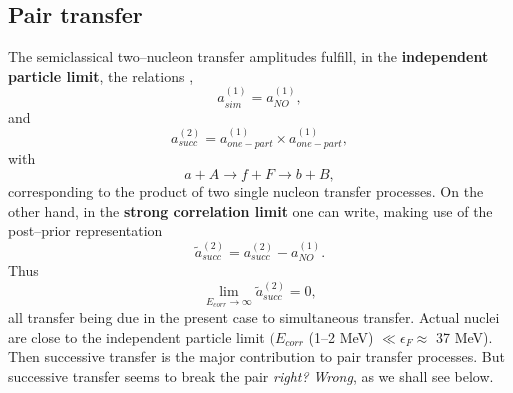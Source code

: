 \documentclass[a4paper,11pt]{book}
\numberwithin{equation}{section}
\numberwithin{figure}{section}
\numberwithin{table}{section}
\begin{document}
\begin{subappendices}
\section{Pair transfer}\label{trans_nutAppA}
The semiclassical two--nucleon transfer amplitudes fulfill, in the \textbf{independent particle limit}, the relations \citep{Potel:13},
\begin{equation}
a_{sim}^{(1)}=a_{NO}^{(1)},
\end{equation}
and
\begin{equation}
a_{succ}^{(2)}=a_{one-part}^{(1)}\times a_{one-part}^{(1)},
\end{equation}
\vspace{0.2cm}
with
\begin{equation}
a+A\rightarrow f+F \rightarrow b+B,
\end{equation}         
corresponding to the product of two single nucleon transfer processes.
On the other hand, in the \textbf{strong correlation limit} one can write, making use of the
post--prior representation
\begin{equation}
\tilde a_{succ}^{(2)}= a_{succ}^{(2)}-a_{NO}^{(1)}.
\end{equation}
Thus
\begin{equation}
\lim_{E_{corr}\rightarrow \infty} \tilde a_{succ}^{(2)}=0,
\end{equation}
all transfer being due in the present case to simultaneous transfer.
Actual nuclei are close to the independent particle limit $(E_{corr}$ (1--2 MeV) $\ll \epsilon_F\approx$ 37 MeV). Then successive transfer is the major contribution to pair transfer processes. But successive transfer seems to break the pair \textit{right?} \textit{Wrong}, as we shall see below.

\end{subappendices}
\end{document}
